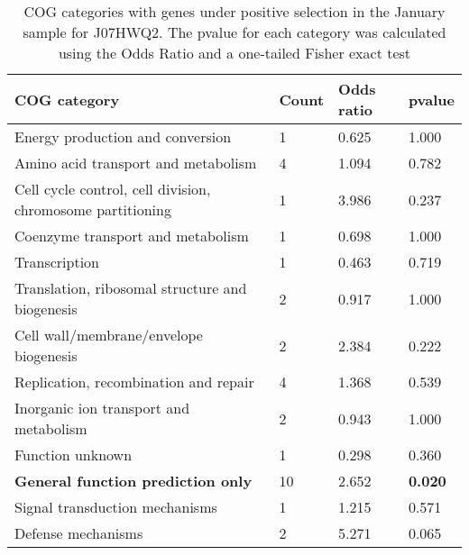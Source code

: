 \begin{table}[]
\footnotesize 
	\tabcolsep=0.11cm 
\caption{COG categories with genes under positive selection in the January sample for J07HWQ2. The pvalue for each category was calculated using the Odds Ratio and a one-tailed Fisher exact test} 
\begin{tabularx}{\textwidth}{L{6cm}R{2cm}R{2cm}R{2cm}} 
\hline 
\textbf{COG category} & \textbf{Count} & \textbf{Odds ratio} & \textbf{pvalue} \\ 
\hline 
Energy production and conversion & 1 & 0.625 & 1.000 \\ 
Amino acid transport and metabolism & 4 & 1.094 & 0.782 \\ 
Cell cycle control, cell division, chromosome partitioning & 1 & 3.986 & 0.237 \\ 
Coenzyme transport and metabolism & 1 & 0.698 & 1.000 \\ 
Transcription & 1 & 0.463 & 0.719 \\ 
Translation, ribosomal structure and biogenesis & 2 & 0.917 & 1.000 \\ 
Cell wall/membrane/envelope biogenesis & 2 & 2.384 & 0.222 \\ 
Replication, recombination and repair & 4 & 1.368 & 0.539 \\ 
Inorganic ion transport and metabolism & 2 & 0.943 & 1.000 \\ 
Function unknown & 1 & 0.298 & 0.360 \\ 
\textbf{General function prediction only} & 10 & 2.652 & \textbf{0.020} \\ 
Signal transduction mechanisms & 1 & 1.215 & 0.571 \\ 
Defense mechanisms & 2 & 5.271 & 0.065 \\ 
\end{tabularx} 
\label{January_COG_Selection_J07HWQ2} 
 \end{table} 

